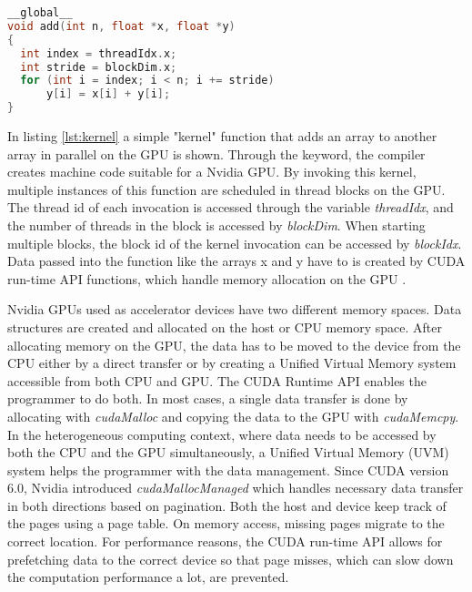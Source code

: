 \begin{lstlisting}[language=C++, caption=Simple CUDA kernel example \cite{EasyIntroductionCUDA2012}, label=lst:kernel]
__global__
void add(int n, float *x, float *y)
{
  int index = threadIdx.x;
  int stride = blockDim.x;
  for (int i = index; i < n; i += stride)
      y[i] = x[i] + y[i];
}
\end{lstlisting}
In listing \ref{lst:kernel} a simple "kernel" function that adds an array to another array in parallel on the GPU is shown. Through the \texttt{} keyword, the compiler creates machine code suitable for a Nvidia GPU. By invoking this kernel, multiple instances of this function are scheduled in thread blocks on the GPU. The thread id of each invocation is accessed through the variable \emph{threadIdx}, and the number of threads in the block is accessed by \emph{blockDim}. When starting multiple blocks, the block id of the kernel invocation can be accessed by \emph{blockIdx}.
Data passed into the function like the arrays x and y have to is created by CUDA run-time API functions, which handle memory allocation on the GPU \cite{MemoryManagement}.

Nvidia GPUs used as accelerator devices have two different memory spaces. Data structures are created and allocated on the host or CPU memory space. After allocating memory on the GPU, the data has to be moved to the device from the CPU either by a direct transfer or by creating a Unified Virtual Memory system accessible from both CPU and GPU. The CUDA Runtime API enables the programmer to do both. In most cases, a single data transfer is done by allocating with \emph{cudaMalloc} and copying the data to the GPU with \emph{cudaMemcpy}. In the heterogeneous computing context, where data needs to be accessed by both the CPU and the GPU simultaneously, a Unified Virtual Memory (UVM) system helps the programmer with the data management. Since CUDA version 6.0, Nvidia introduced \emph{cudaMallocManaged} which handles necessary data transfer in both directions based on pagination. \cite{gayatriComparingManagedMemory} Both the host and device keep track of the pages using a page table. On memory access, missing pages migrate to the correct location.
For performance reasons, the CUDA run-time API allows for prefetching data to the correct device so that page misses, which can slow down the computation performance a lot, are prevented.


